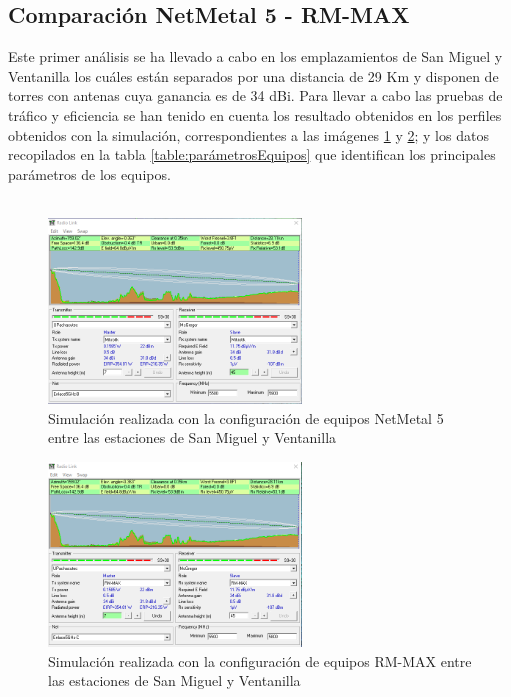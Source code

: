 \subsection{Comparación NetMetal 5 - RM-MAX}
 Este primer análisis se ha llevado a cabo en los emplazamientos de San Miguel y Ventanilla los cuáles están separados por una distancia de 29 Km y disponen de torres con antenas cuya ganancia es de 34 dBi. Para llevar a cabo las pruebas de tráfico  y eficiencia se han tenido en cuenta los resultado obtenidos en los perfiles obtenidos con la simulación, correspondientes a las imágenes \ref{mikro_sanmiguel} y \ref{mikro_rmmax}; y los datos recopilados en la tabla \ref{table:parámetrosEquipos} que identifican los principales parámetros de los equipos.\\\\
  \begin{figure}[H]
			\centering
			\includegraphics[width=0.6\textwidth]{img/Mikrotik_pruebas.png}
			\caption{Simulación realizada con la configuración de equipos NetMetal 5 entre las estaciones de San Miguel y Ventanilla}
			\label{mikro_sanmiguel}
\end{figure}
 \begin{figure}[H]
			\centering
			\includegraphics[width=0.6\textwidth]{img/rmmax_pruebas.png}
			\caption{Simulación realizada con la configuración de equipos RM-MAX entre las estaciones de San Miguel y Ventanilla}
			\label{mikro_rmmax}
\end{figure}
